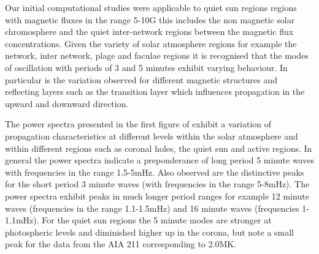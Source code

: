 \documentclass[linenumbers]{aastex63}
\begin{document}
Our initial computational studies were applicable to quiet sun regions regions with magnetic fluxes in the range 5-10G this includes the non magnetic solar chromosphere and the quiet inter-network regions between the magnetic flux concentrations. Given the variety of solar atmosphere regions for example the network, inter network, plage and faculae regions it is recognised that the modes of oscillation with periods of 3 and 5 minutes exhibit varying behaviour. In particular is the variation observed for different magnetic structures and reflecting layers such as the transition layer which influences propagation in the upward and downward direction.






 

The power spectra presented in the first figure of \citet{Griffiths2018b} exhibit a variation of propagation characteristics at different levels within the solar atmosphere and within different regions such as coronal holes, the quiet sun and active regions. In general the power spectra indicate a preponderance of long period 5 minute waves with frequencies in the range 1.5-5mHz. Also observed are the distinctive peaks for the short period 3 minute waves (with frequencies in the range 5-8mHz). The power spectra exhibit peaks in much longer period ranges for example 12 minute waves  (frequencies in the range 1.1-1.5mHz)  and 16 minute waves (frequencies 1-1.1mHz). For the quiet sun regions the 5 minute modes are stronger at photospheric levels and diminished higher up in the corona, but note a small peak for the data from the AIA 211 corresponding to 2.0MK. 

\end{document}
